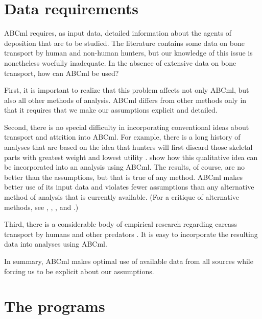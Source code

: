 \section{Data requirements}

ABCml requires, as input data, detailed information about the agents of
deposition that are to be studied.  The literature contains some data on bone
transport by human and non-human hunters, but our knowledge of this issue is
nonetheless woefully inadequate.  In the absence of extensive data on bone
transport, how can ABCml be used?

First, it is important to realize that this problem affects not only ABCml,
but also all other methods of analysis.  ABCml differs from other methods only
in that it requires that we make our assumptions explicit and detailed.  

Second, there is no special difficulty in incorporating conventional ideas
about transport and attrition into ABCml.  For example, there is a long
history of analyses that are based on the idea that hunters will first discard
those skeletal parts with greatest weight and lowest utility
\cite{White:AA-19-254,Perkins:SA-219-97}.  \citet{Rogers:JAS-00} show how this
qualitative idea can be incorporated into an analysis using ABCml.  The
results, of course, are no better than the assumptions, but that is true of
any method.  ABCml makes better use of its input data and violates fewer
assumptions than any alternative method of analysis that is currently
available. (For a critique of alternative methods, see
\citet{Rogers:JAS-27-111}, \citet{Rogers:JAS-27-635}, \citet{Rogers:AA-00-x},
and \citet{Rogers:JAS-00}.)

Third, there is a considerable body of empirical research regarding 
carcass transport by humans and other predators 
\citep{Binford:NE-78,Bunn:JAA-7-412,O'Connell:JAR-44-113,Marean:JAS-19-101}.
It is easy to incorporate the resulting data into analyses using ABCml.

In summary, ABCml makes optimal use of available data from all sources while
forcing us to be explicit about our assumptions.

\section{The programs}

